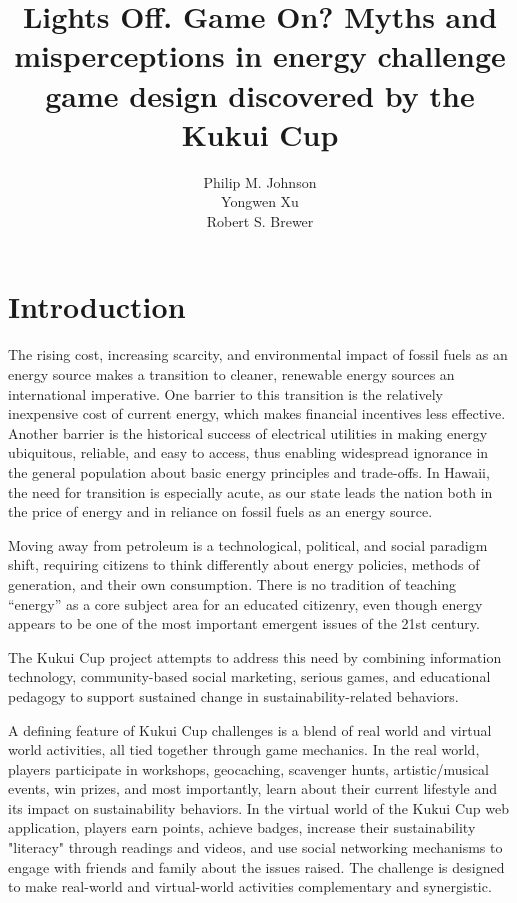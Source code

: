 \documentclass[man]{apa} %
\title{Lights Off.  Game On?  Myths and misperceptions in energy challenge game design
  discovered by the Kukui Cup}
\author{\smallskip Philip M. Johnson \\ 
        \smallskip Yongwen Xu \\ 
        \smallskip Robert S. Brewer}
\affiliation{Collaborative Software Development Laboratory \\ Information and Computer
  Sciences \\ University of Hawaii \\ Honolulu, HI USA \\ johnson@hawaii.edu}
\begin{document}
\maketitle 

\section{Introduction}  

The rising cost, increasing scarcity, and environmental impact of fossil fuels as an
energy source makes a transition to cleaner, renewable energy sources an international
imperative.  One barrier to this transition is the relatively inexpensive cost of current
energy, which makes financial incentives less effective. Another barrier is the historical
success of electrical utilities in making energy ubiquitous, reliable, and easy to access,
thus enabling widespread ignorance in the general population about basic energy principles
and trade-offs.  In Hawaii, the need for transition is especially acute, as our state
leads the nation both in the price of energy and in reliance on fossil fuels as an energy
source.

Moving away from petroleum is a technological, political, and social paradigm shift,
requiring citizens to think differently about energy policies, methods of generation, and
their own consumption. There is no tradition of teaching ``energy'' as a core subject area
for an educated citizenry, even though energy appears to be one of the most important
emergent issues of the 21st century.

The Kukui Cup project attempts to address this need by combining information technology,
community-based social marketing, serious games, and educational pedagogy to support
sustained change in sustainability-related behaviors. 

A defining feature of Kukui Cup challenges is a blend of real world and virtual world
activities, all tied together through game mechanics.  In the real world, players
participate in workshops, geocaching, scavenger hunts, artistic/musical events, win
prizes, and most importantly, learn about their current lifestyle and its impact on
sustainability behaviors.  In the virtual world of the Kukui Cup web application, players
earn points, achieve badges, increase their sustainability "literacy" through readings and
videos, and use social networking mechanisms to engage with friends and family about the
issues raised. The challenge is designed to make real-world and virtual-world activities
complementary and synergistic.
\end{document}
